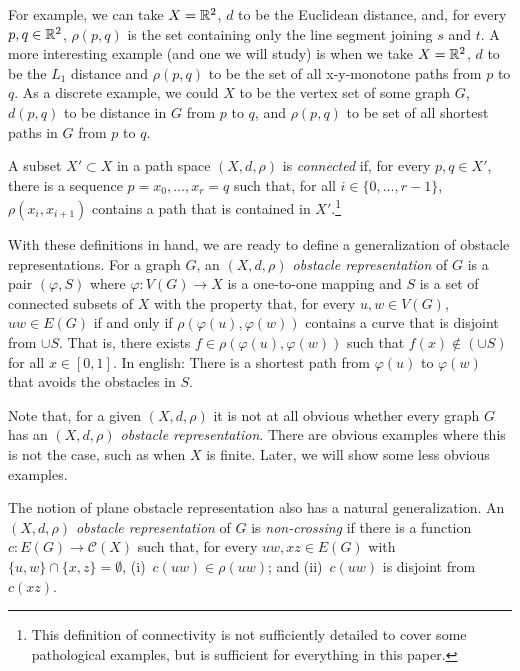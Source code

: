 \documentclass{patmorin}
\begin{document}
For example, we can take $X=\mathbb{R}^2$, $d$ to be the Euclidean distance,
and, for every $p,q\in\mathbb{R}^2$, $\rho(p,q)$ is the set containing only
the line segment joining $s$ and $t$.  A more interesting example
(and one we will study) is when we take $X=\mathbb{R}^2$, $d$ to be the $L_1$
distance and $\rho(p,q)$ to be the set of all x-y-monotone paths from
$p$ to $q$. As a discrete example, we could $X$ to be the vertex set
of some graph $G$, $d(p,q)$ to be distance in $G$ from $p$ to $q$, 
and $\rho(p,q)$ to be set of all shortest paths in $G$ from $p$ to $q$.

A subset $X'\subset X$ in a path space $(X,d,\rho)$ is \emph{connected}
if, for every $p,q\in X'$, there is a sequence $p=x_0,\ldots,x_r=q$ such
that, for all $i\in\{0,\ldots,r-1\}$, $\rho(x_i,x_{i+1})$ contains a path
that is contained in $X'$.\footnote{This definition of connectivity is
not sufficiently detailed to cover some pathological examples, but is
sufficient for everything in this paper.}

With these definitions in hand, we are ready to define a generalization of
obstacle representations.  For a graph $G$, an \emph{$(X,d,\rho)$ obstacle
representation} of $G$ is a pair $(\varphi, S)$ where $\varphi:V(G)\to
X$ is a one-to-one mapping and $S$ is a set of connected subsets of $X$
with the property that, for every $u,w\in V(G)$, $uw\in E(G)$ if and
only if $\rho(\varphi(u),\varphi(w))$ contains a curve that is disjoint
from $\cup S$. That is, there exists $f\in\rho(\varphi(u),\varphi(w))$
such that $f(x)\not\in (\cup S)$ for all $x\in[0,1]$. In english: There is
a shortest path from $\varphi(u)$ to $\varphi(w)$ that avoids the obstacles in $S$.

Note that, for a given $(X,d,\rho)$ it is not at all obvious whether
every graph $G$ has an \emph{$(X,d,\rho)$ obstacle representation}.
There are obvious examples where this is not the case, such as when $X$
is finite.  Later, we will show some less obvious examples.

The notion of plane obstacle representation also has a natural
generalization.  An \emph{$(X,d,\rho)$ obstacle representation} of $G$
is \emph{non-crossing} if there is a function $c:E(G)\to \mathcal{C}(X)$
such that, for every $uw,xz\in E(G)$ with $\{u,w\}\cap \{x,z\}=\emptyset$,
(i)~$c(uw)\in \rho(uw)$; and (ii)~$c(uw)$ is disjoint from $c(xz)$.
\end{document}
